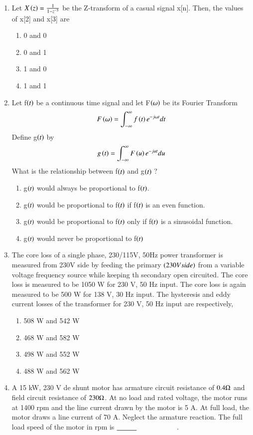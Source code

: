 \documentclass[journal,12pt,onecolumn]{IEEEtran}
\theoremstyle{remark}
\begin{document}
\begin{enumerate}
\begin{enumerate}
    \item $u\brak{t} + \frac{t}{T}u\brak{t-T} - \frac{t}{T}u\brak{t-2T}$
    \item $u\brak{t} - u\brak{t-T} + \frac{\brak{t-T}}{T}u\brak{t}- \frac{\brak{t-2T}}{T}u\brak{t}$
    \item $u\brak{t} + \frac{\brak{t-T}}{T}u\brak{t-T} - 2\frac{\brakt-2T}}{T}u\brak{t-2T}$
\end{enumerate}
\item Let $ X\brak{z} = \frac{1}{1 - z^{-3}}$ be the Z-transform of a casual signal x[n]. Then, the values of x[2] and x[3] are
\begin{enumerate}
    \item 0 and 0
    \item 0 and 1
    \item 1 and 0
    \item 1 and 1
\end{enumerate}
\item Let f$\brak{t}$ be a continuous time signal and let F$\brak{\omega}$ be its Fourier Transform $$F\brak{\omega}=\int_{-\infty}^{\infty} f\brak{t}e^{-j\omega t} dt$$
Define g$\brak{t}$ by $$g\brak{t} = \int_{-\infty}^{\infty} F\brak{u}e^{-jut} du$$
What is the relationship between f$\brak{t}$
and g$\brak{t}$ ?
\begin{enumerate}
    \item g$\brak{t}$ would always be proportional to f$\brak{t}$.
    \item g$\brak{t}$ would be proportional to f$\brak{t}$ if f$\brak{t}$ is an even function.
    \item g$\brak{t}$ would be proportional to f$\brak{t}$ only if f$\brak{t}$ is a sinusoidal function.
    \item g$\brak{t}$ would never be proportional to f$\brak{t}$
\end{enumerate}
\item The core loss of a single phase, 230/115V, 50Hz power transformer is measured from 230V side by feeding the primary $\brak{230 V side}$ from a variable voltage frequency source while keeping th secondary open circuited. The core loss is measured to be 1050 W for 230 V, 50 Hz input. The core loss is again measured to be 500 W for 138 V, 30 Hz input. The hysteresis and eddy current losses of the transformer for 230 V, 50 Hz input are respectively,
\begin{enumerate}
    \item 508 W and 542 W
    \item 468 W and 582 W
    \item 498 W and 552 W
    \item 488 W and 562 W
\end{enumerate}
\item A 15 kW, 230 V de shunt motor has armature circuit resistance of $0.4\ohm$ and field circuit resistance of $230\ohm$. At no load and rated voltage, the motor runs at 1400 rpm and the line current drawn by the motor is 5 A. At full load, the motor draws a line current of 70 A. Neglect the armature reaction. The full load speed of the motor in rpm is $\makebox[3cm][l]{\underline{\hspace{1cm}}}$.


\end{enumerate}
\end{document}
